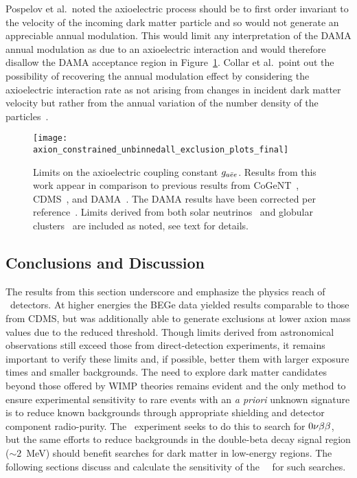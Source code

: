 	Pospelov et al.~noted the axioelectric process should be to first order invariant to the velocity of the incoming dark matter particle and so would not generate an appreciable annual modulation.  This would limit any interpretation of the DAMA annual modulation as due to an axioelectric interaction and would therefore disallow the DAMA acceptance region in Figure~\ref{fig:HeavyAxionLimits}.  Collar et al.~point out the possibility of recovering the annual modulation effect by considering the axioelectric interaction rate as not arising from changes in incident dark matter velocity but rather from the annual variation of the number density of the particles~\cite{Collar:2009sp}. 
			
		\begin{figure}
			\centering
			\texttt{[image: axion\_constrained\_unbinnedall\_exclusion\_plots\_final]}
			\caption[Limits on the axioelectric coupling constant $\gaa$]{Limits on the axioelectric 
			coupling constant $\gaa$.  Results from this work appear in comparison to previous 
			results from CoGeNT~\cite{Aalseth:2008aa}, CDMS~\cite{Ahmed2009}, and 
			DAMA~\cite{Bernabei:2005ca}.  The DAMA results have been corrected per 
			reference~\cite{Collar:2009sp}.  Limits derived from both solar neutrinos~\cite{Gondolo09} and globular clusters~\cite{Raffelt95} are included as noted, see text for details.}
			\label{fig:HeavyAxionLimits}
		\end{figure}
		
	\subsection{Conclusions and Discussion}
	\label{sec:DiscOnHeavyAxionLimits}	

	
	The results from this section underscore and emphasize the physics reach of \ppc~detectors. At higher energies the BEGe data yielded results comparable to those from CDMS, but was additionally able to generate exclusions at lower axion mass values due to the reduced threshold.  Though limits derived from astronomical observations still exceed those from direct-detection experiments, it remains important to verify these limits and, if possible, better them with larger exposure times and smaller backgrounds.  The need to explore dark matter candidates beyond those offered by WIMP theories remains evident and the only method to ensure experimental sensitivity to rare events with an \emph{a priori} unknown signature is to reduce known backgrounds through appropriate shielding and detector component radio-purity.  The \MJ~experiment seeks to do this to search for $0 \nu \beta \beta$, but the same efforts to reduce backgrounds in the double-beta decay signal region ($\sim2$~MeV) should benefit searches for dark matter in low-energy regions.  The following sections discuss and calculate the sensitivity of the \MJ~\minmod~for such searches.
							
